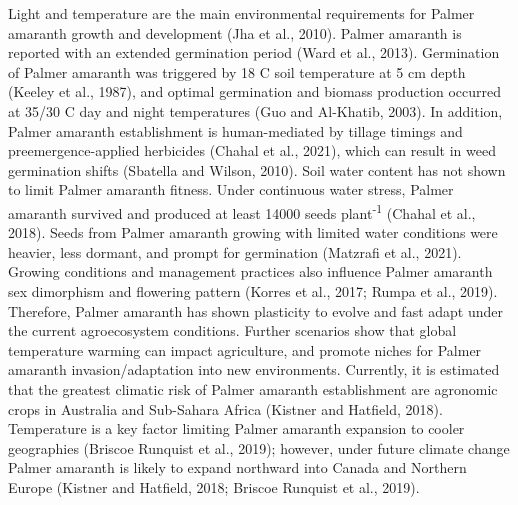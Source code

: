 \documentclass[utf8]{frontiersSCNS}
\begin{document}
Light and temperature are the main environmental requirements for Palmer
amaranth growth and development (Jha et al., 2010). Palmer amaranth is
reported with an extended germination period (Ward et al., 2013).
Germination of Palmer amaranth was triggered by 18 C soil temperature at
5 cm depth (Keeley et al., 1987), and optimal germination and biomass
production occurred at 35/30 C day and night temperatures (Guo and
Al-Khatib, 2003). In addition, Palmer amaranth establishment is
human-mediated by tillage timings and preemergence-applied herbicides
(Chahal et al., 2021), which can result in weed germination shifts
(Sbatella and Wilson, 2010). Soil water content has not shown to limit
Palmer amaranth fitness. Under continuous water stress, Palmer amaranth
survived and produced at least 14000 seeds plant\textsuperscript{-1}
(Chahal et al., 2018). Seeds from Palmer amaranth growing with limited
water conditions were heavier, less dormant, and prompt for germination
(Matzrafi et al., 2021). Growing conditions and management practices
also influence Palmer amaranth sex dimorphism and flowering pattern
(Korres et al., 2017; Rumpa et al., 2019). Therefore, Palmer amaranth
has shown plasticity to evolve and fast adapt under the current
agroecosystem conditions. Further scenarios show that global temperature
warming can impact agriculture, and promote niches for Palmer amaranth
invasion/adaptation into new environments. Currently, it is estimated
that the greatest climatic risk of Palmer amaranth establishment are
agronomic crops in Australia and Sub-Sahara Africa (Kistner and
Hatfield, 2018). Temperature is a key factor limiting Palmer amaranth
expansion to cooler geographies (Briscoe Runquist et al., 2019);
however, under future climate change Palmer amaranth is likely to expand
northward into Canada and Northern Europe (Kistner and Hatfield, 2018;
Briscoe Runquist et al., 2019).
\end{document}
